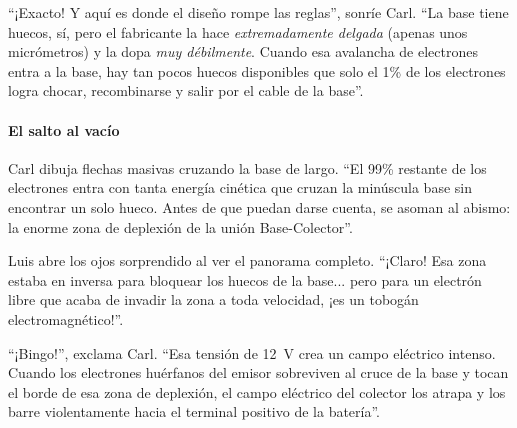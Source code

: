 ``¡Exacto! Y aquí es donde el diseño rompe las reglas'', sonríe Carl. ``La base tiene huecos, sí, pero el fabricante la hace \emph{extremadamente delgada} (apenas unos micrómetros) y la dopa \emph{muy débilmente}. Cuando esa avalancha de electrones entra a la base, hay tan pocos huecos disponibles que solo el 1\% de los electrones logra chocar, recombinarse y salir por el cable de la base''.

\paragraph{El salto al vacío}
Carl dibuja flechas masivas cruzando la base de largo. ``El 99\% restante de los electrones entra con tanta energía cinética que cruzan la minúscula base sin encontrar un solo hueco. Antes de que puedan darse cuenta, se asoman al abismo: la enorme zona de deplexión de la unión Base-Colector''.

Luis abre los ojos sorprendido al ver el panorama completo. ``¡Claro! Esa zona estaba en inversa para bloquear los huecos de la base... pero para un electrón libre que acaba de invadir la zona a toda velocidad, ¡es un tobogán electromagnético!''.

``¡Bingo!'', exclama Carl. ``Esa tensión de \qty{12}{\volt} crea un campo eléctrico intenso. Cuando los electrones huérfanos del emisor sobreviven al cruce de la base y tocan el borde de esa zona de deplexión, el campo eléctrico del colector los atrapa y los barre violentamente hacia el terminal positivo de la batería''.
